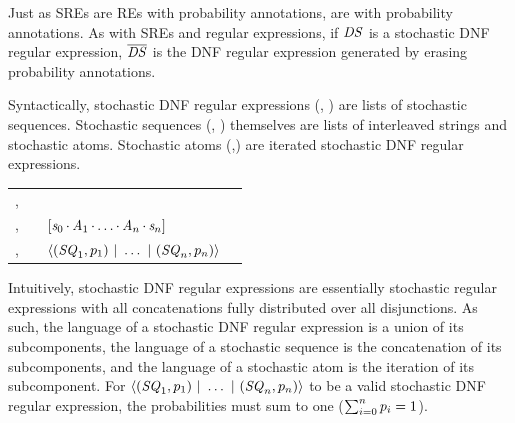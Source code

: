 \documentclass[acmsmall,screen,anonymous]{acmart}
\begin{document}
Just as SREs are REs with probability annotations,
\SDNFREabbrevs are \DNFREabbrevs with probability annotations.
As with SREs and regular
expressions, if $\mathit{DS}$ is a stochastic DNF regular expression,
$\overline{\mathit{DS}}$ is the DNF regular expression generated by erasing
probability annotations.

Syntactically, stochastic DNF regular expressions (\DNFRegex, \DNFRegexAlt) are
lists of stochastic sequences. Stochastic sequences (\Sequence, \SequenceAlt)
themselves are lists of interleaved strings and stochastic atoms. Stochastic
atoms (\Atom,\AtomAlt) are iterated stochastic DNF regular expressions.

\begin{center}
  \begin{tabular}{l@{\ }c@{\ }l@{\ }>{\itshape\/}r}
    \Atom{},\AtomAlt{} & \GEq{} & \PRegexStar{\DNFRegex{}}{\Probability}
\\
    \Sequence{},\SequenceAlt{} & \GEq{} &
                                                       $[\mathit{s}_0\mkern-1mu\cdot\mkern-1mu\mathit{A}_1\mkern-1mu\cdot\mkern-1mu\ldots\mkern-1mu\cdot\mkern-1mu\mathit{A}_n\mkern-1mu\cdot\mkern-1mu\mathit{s}_n]$ 
\\
    \DNFRegex{},\DNFRegexAlt{} & \GEq{} & $\langle(\mathit{SQ}_1,p_1)~|~\ldots~|~(\mathit{SQ}_n,p_n)\rangle$ %
  \end{tabular}
\end{center}

Intuitively, stochastic DNF regular expressions are essentially stochastic
regular expressions with all concatenations fully distributed over all
disjunctions. As such, the language of a stochastic DNF regular expression is a
union of its subcomponents, the language of a stochastic sequence is the
concatenation of its subcomponents, and the language of a stochastic atom is the
iteration of its subcomponent. For
$\langle(\mathit{SQ}_1,p_1)~|~\ldots~|~(\mathit{SQ}_n,p_n)\rangle$
to be a valid stochastic DNF regular expression, the probabilities must sum to
one ($\sum_{i=0}^np_i = 1$).
\end{document}

